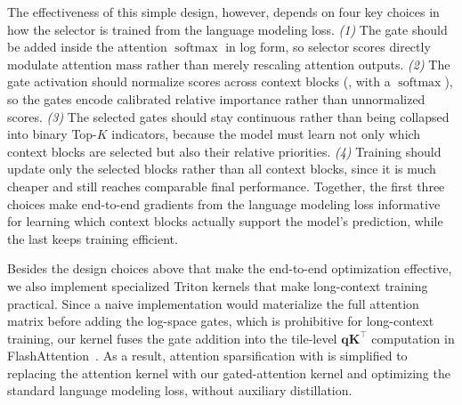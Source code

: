 The effectiveness of this simple design, however, depends on four key choices in how the selector is trained from the language modeling loss.
\emph{(1)} The gate should be added inside the attention $\operatorname{softmax}$ in log form, so selector scores directly modulate attention mass rather than merely rescaling attention outputs.
\emph{(2)} The gate activation should normalize scores across context blocks (\eg, with a $\operatorname{softmax}$), so the gates encode calibrated relative importance rather than unnormalized scores.
\emph{(3)} The selected gates should stay continuous rather than being collapsed into binary Top-$K$ indicators, because the model must learn not only which context blocks are selected but also their relative priorities.
\emph{(4)} Training should update only the selected blocks rather than all context blocks, since it is much cheaper and still reaches comparable final performance.
Together, the first three choices make end-to-end gradients from the language modeling loss informative for learning which context blocks actually support the model's prediction, while the last keeps training efficient.

Besides the design choices above that make the end-to-end optimization effective, we also implement specialized Triton \citep{tillet2019triton} kernels that make long-context training practical. Since a naive implementation would materialize the full attention matrix before adding the log-space gates, which is prohibitive for long-context training, our kernel fuses the gate addition into the tile-level $\mathbf{q}\mathbf{K}^\top$ computation in FlashAttention~\citep{dao2022flashattention}. As a result, attention sparsification with \our is simplified to replacing the attention kernel with our gated-attention kernel and optimizing the standard language modeling loss, without auxiliary distillation.

